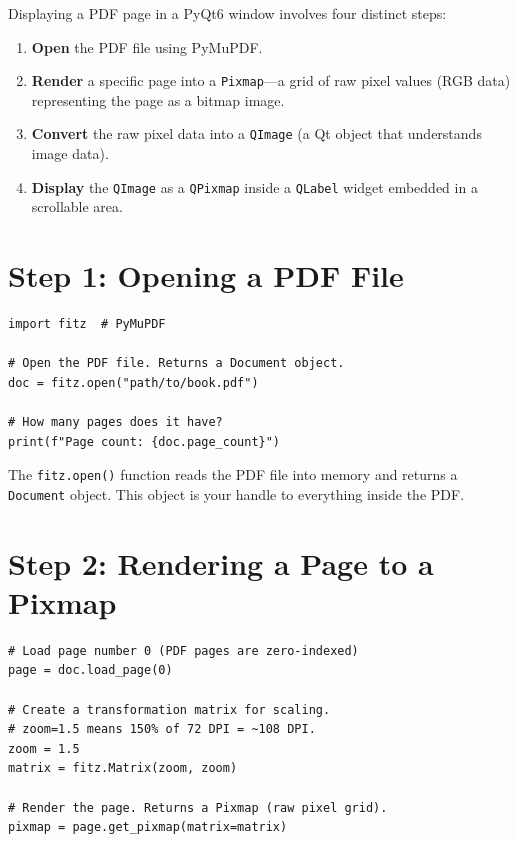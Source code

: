 \documentclass[12pt,oneside]{book}
\begin{document}
Displaying a PDF page in a PyQt6 window involves four distinct steps:

\begin{enumerate}
  \item \textbf{Open} the PDF file using PyMuPDF.
  \item \textbf{Render} a specific page into a \texttt{Pixmap}—a grid of raw pixel values
    (RGB data) representing the page as a bitmap image.
  \item \textbf{Convert} the raw pixel data into a \texttt{QImage} (a Qt object that
    understands image data).
  \item \textbf{Display} the \texttt{QImage} as a \texttt{QPixmap} inside a
    \texttt{QLabel} widget embedded in a scrollable area.
\end{enumerate}

\section{Step 1: Opening a PDF File}

\begin{lstlisting}[caption={Opening a PDF with PyMuPDF (LLR-04)}]
import fitz  # PyMuPDF

# Open the PDF file. Returns a Document object.
doc = fitz.open("path/to/book.pdf")

# How many pages does it have?
print(f"Page count: {doc.page_count}")
\end{lstlisting}

The \texttt{fitz.open()} function reads the PDF file into memory and returns a
\texttt{Document} object. This object is your handle to everything inside the PDF.

\section{Step 2: Rendering a Page to a Pixmap}

\begin{lstlisting}[caption={Rendering a page as a bitmap (LLR-04)}]
# Load page number 0 (PDF pages are zero-indexed)
page = doc.load_page(0)

# Create a transformation matrix for scaling.
# zoom=1.5 means 150% of 72 DPI = ~108 DPI.
zoom = 1.5
matrix = fitz.Matrix(zoom, zoom)

# Render the page. Returns a Pixmap (raw pixel grid).
pixmap = page.get_pixmap(matrix=matrix)
\end{lstlisting}
\end{document}
